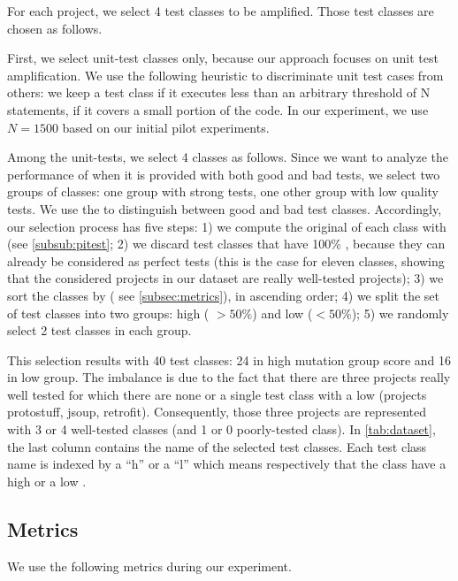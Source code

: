 For each project, we select 4 test classes to be amplified. Those test classes are chosen as follows.

First, we select unit-test classes only,
because our approach focuses on unit test amplification. We use the following heuristic to discriminate unit test cases from others: we keep a test class if it executes less than an arbitrary threshold of N statements, \ie if it covers a small portion of the code. In our experiment, we use $N=1500$ based on our initial pilot experiments.


Among the unit-tests, we select 4 classes as follows. Since we want to analyze the performance of \dspot{} when it is provided with both good and bad tests, we select two groups of classes: one group with strong tests, one other group with low quality tests.
We use the \ms to distinguish between good and bad test classes.
Accordingly, our selection process has five steps: 
1) we compute the original \ms of each class with \pitest (see \autoref{subsub:pitest};
2) we discard test classes that have 100\% \ms, because they can already be considered as perfect tests (this is the case for eleven classes, showing that the considered projects in our dataset are really well-tested projects);
3) we sort the classes by \ms ( see \autoref{subsec:metrics}), in ascending order;
4) we split the set of test classes into two groups: high \ms( $> 50\%$) and low \ms  ($< 50\%$);
5) we randomly select 2 test classes in each group.

This selection results with 40 test classes: 24 in high mutation group score and 16 in low \ms group. The imbalance is due to the fact that there are three projects really well tested for which there are none or a single test class with a low \ms (projects protostuff, jsoup, retrofit). Consequently, those three projects are represented with 3 or 4 well-tested classes (and 1 or 0 poorly-tested class). In \autoref{tab:dataset}, the last column contains the name of the selected test classes. Each test class name is indexed by a ``h'' or a ``l'' which means respectively that the class have a high \ms or a low \ms.


\subsection{Metrics}
\label{subsec:metrics}

We use the following metrics during our experiment.


